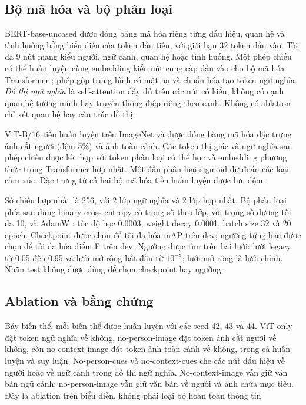 \documentclass[conference]{IEEEtran}
\newcommand{\ev}[2]{#2}
\begin{document}
\subsection{Bộ mã hóa và bộ phân loại}
BERT-base-uncased được đóng băng \cite{bert} mã hóa riêng từng dấu hiệu, quan hệ và tình huống bằng biểu diễn của token đầu tiên, với giới hạn \ev{bert-max-length}{32} token đầu vào. Tối đa \ev{max-graph-nodes}{9} nút mang kiểu người, ngữ cảnh, quan hệ hoặc tình huống. Một phép chiếu có thể huấn luyện cùng embedding kiểu nút cung cấp đầu vào cho bộ mã hóa Transformer \cite{transformer}; phép gộp trung bình có mặt nạ và chuẩn hóa tạo token ngữ nghĩa. \emph{Đồ thị ngữ nghĩa} là self-attention đầy đủ trên các nút có kiểu, không có cạnh quan hệ tường minh hay truyền thông điệp riêng theo cạnh. Không có ablation chỉ xét quan hệ hay cấu trúc đồ thị.

\ev{vit}{ViT-B/16} tiền huấn luyện trên ImageNet và được đóng băng \cite{vit} mã hóa đặc trưng ảnh cắt người (đệm 5\%) và ảnh toàn cảnh. Các token thị giác và ngữ nghĩa sau phép chiếu được kết hợp với token phân loại có thể học và embedding phương thức trong Transformer hợp nhất. Một đầu phân loại sigmoid dự đoán các loại cảm xúc. Đặc trưng từ cả hai bộ mã hóa tiền huấn luyện được lưu đệm.

Số chiều hợp nhất là \ev{fusion-dim}{256}, với \ev{graph-layers}{2} lớp ngữ nghĩa và \ev{fusion-layers}{2} lớp hợp nhất. Bộ phân loại phía sau dùng binary cross-entropy có trọng số theo lớp, với trọng số dương tối đa 10, và AdamW \cite{adamw}: tốc độ học \ev{lr}{0.0003}, weight decay \ev{weight-decay}{0.0001}, batch size \ev{batch-size}{32} và \ev{epochs}{20} epoch. Checkpoint được chọn để tối đa hóa mAP trên dev; ngưỡng từng loại được chọn để tối đa hóa điểm F trên dev. Ngưỡng được tìm trên hai lưới: lưới legacy từ 0.05 đến 0.95 và lưới mở rộng bắt đầu từ $10^{-8}$; lưới mở rộng là lưới chính. Nhãn test không được dùng để chọn checkpoint hay ngưỡng.

\subsection{Ablation và bằng chứng}
Bảy biến thể, mỗi biến thể được huấn luyện với các seed 42, 43 và 44. ViT-only đặt token ngữ nghĩa về không, no-person-image đặt token ảnh cắt người về không, còn no-context-image đặt token ảnh toàn cảnh về không, trong cả huấn luyện và suy luận. No-person-cues và no-context-cues che các nút dấu hiệu về người hoặc về ngữ cảnh trong đồ thị ngữ nghĩa. No-context-image vẫn giữ văn bản ngữ cảnh; no-person-image vẫn giữ văn bản về người và ảnh chứa mục tiêu. Đây là ablation trên biểu diễn, không phải loại bỏ hoàn toàn thông tin.
\end{document}
